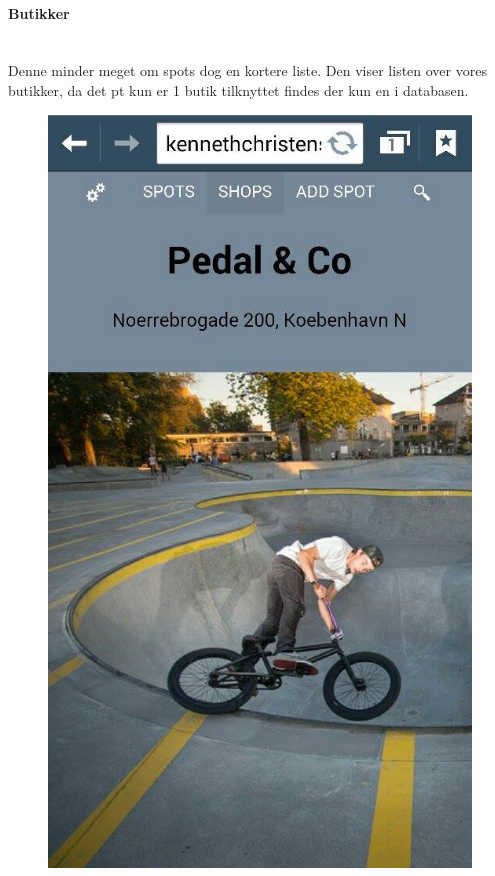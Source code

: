 \documentclass[12pt]{article}
\begin{document}
\newpage
\paragraph{Butikker}\mbox{}\\
Denne minder meget om spots dog en kortere liste. Den viser listen over vores butikker, da det pt kun er 1 butik tilknyttet findes der kun en i databasen.\\
\begin{figure}[h]
\includegraphics[scale = 0.3]{shops}
\end{figure}
\end{document}
